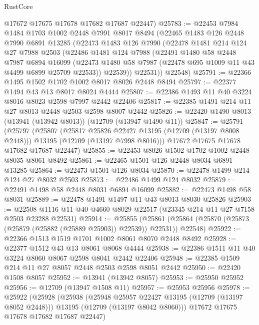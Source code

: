 \begin{lexlean}{RustCore}
\begin{coremodule}
      @17672
      @17675
      @17678
      @17682
      @17687
      @22447)
@25783 := @22453
    @7984
    @1484
    @1703
    @1002
    @2448
    @7991
    @8017
    @8494
    (@22465
      @1483
      @126
      @2448
      @7990
      @6891
      @13285
      (@22473
        @1483
        @126
        @7990
        (@22478
          @1481
          @214
          @124
          @27
          @7988
          @2503
          (@22486
            @1481
            @124
            @7988
            (@22491
              @1480
              @58
              @2448
              @7987
              @6894
              @16099
              (@22473 @1480 @58 @7987 (@22478 @695 @1009 @11 @43 @4499 @6899 @25709 @22533))
              @22539))
          @22531))
      @22548)
@25791 := @22366 @1495 @1502 @1702 @1002 @8017 @8026 @2448 @8494
@25797 := @22377 @1494 @43 @13 @8017 @8024 @4444
@25807 := @22386 @1493 @11 @40 @3224 @8016 @8023 @2598 @7997 @2442 @22406
@25817 := @22385 @1491 @214 @11 @27 @8013 @2448 @2503 @2598 @8007 @2442
@25826 := @22420 @1490 @8013 (@13941 (@13942 @8013)) (@12709 (@13947 @1490 @11))
@25847 := @25791
    (@25797
      (@25807
        (@25817 @25826 @22427 @13195 (@12709 (@13197 @8008 @2448)))
        @13195
        (@12709 (@13197 @7998 @8016)))
      @17672
      @17675
      @17678
      @17682
      @17687
      @22447)
@25855 := @22453 @8026 @1502 @1702 @1002 @2448 @8035 @8061 @8492
@25861 := @22465 @1501 @126 @2448 @8034 @6891 @13285
@25864 := @22473 @1501 @126 @8034
@25870 := @22478 @1499 @214 @124 @27 @8032 @2503
@25873 := @22486 @1499 @124 @8032
@25879 := @22491 @1498 @58 @2448 @8031 @6894 @16099
@25882 := @22473 @1498 @58 @8031
@25889 := @22478 @1491 @1497 @11 @43 @8013 @8030 @25826
@25903 := @22508 @1116 @11 @40 @4660 @8029 @22517 (@23345 @214 @11 @27 @7158 @2503 @23288 @22531)
@25914 := @25855
    (@25861 (@25864 (@25870 (@25873 (@25879 (@25882 (@25889 @25903)) @22539)) @22531)) @22548)
@25922 := @22366 @1513 @1519 @1701 @1002 @8061 @8070 @2448 @8492
@25928 := @22377 @1512 @43 @13 @8061 @8068 @4444
@25938 := @22386 @1511 @11 @40 @3224 @8060 @8067 @2598 @8041 @2442 @22406
@25948 := @22385 @1509 @214 @11 @27 @8057 @2448 @2503 @2598 @8051 @2442
@25950 := @22420 @1508 @8057
@25952 := @13941 (@13942 @8057)
@25953 := @25950 @25952
@25956 := @12709 (@13947 @1508 @11)
@25957 := @25953 @25956
@25978 := @25922
    (@25928
      (@25938
        (@25948 @25957 @22427 @13195 (@12709 (@13197 @8052 @2448)))
        @13195
        (@12709 (@13197 @8042 @8060)))
      @17672
      @17675
      @17678
      @17682
      @17687
      @22447)

\end{coremodule}
\end{lexlean}
